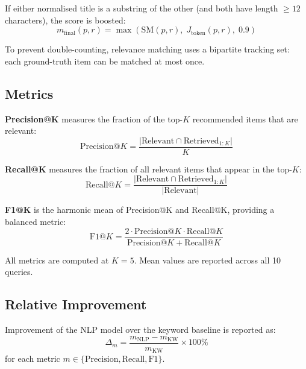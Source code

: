 \documentclass[12pt, a4paper]{article}
\begin{document}
If either normalised title is a substring of the other (and both have length $\geq 12$
characters), the score is boosted:
\begin{equation}
    m_{\text{final}}(p, r) = \max\!\left(\text{SM}(p, r),\; J_{\text{token}}(p, r),\; 0.9\right)
    \label{eq:fuzzyboosted}
\end{equation}

To prevent double-counting, relevance matching uses a bipartite tracking set: each ground-truth
item can be matched at most once.

\subsection{Metrics}

\textbf{Precision@K} measures the fraction of the top-$K$ recommended items that are relevant:
\begin{equation}
    \text{Precision@}K = \frac{|\text{Relevant} \cap \text{Retrieved}_{1:K}|}{K}
    \label{eq:precision}
\end{equation}

\textbf{Recall@K} measures the fraction of all relevant items that appear in the top-$K$:
\begin{equation}
    \text{Recall@}K = \frac{|\text{Relevant} \cap \text{Retrieved}_{1:K}|}{|\text{Relevant}|}
    \label{eq:recall}
\end{equation}

\textbf{F1@K} is the harmonic mean of Precision@K and Recall@K, providing a balanced metric:
\begin{equation}
    \text{F1@}K = \frac{2 \cdot \text{Precision@}K \cdot \text{Recall@}K}{\text{Precision@}K + \text{Recall@}K}
    \label{eq:f1}
\end{equation}

All metrics are computed at $K=5$. Mean values are reported across all 10 queries.

\subsection{Relative Improvement}

Improvement of the NLP model over the keyword baseline is reported as:
\begin{equation}
    \Delta_m = \frac{m_{\text{NLP}} - m_{\text{KW}}}{m_{\text{KW}}} \times 100\%
    \label{eq:improvement}
\end{equation}
for each metric $m \in \{\text{Precision}, \text{Recall}, \text{F1}\}$.
\end{document}
